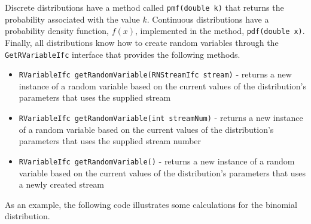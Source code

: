 \documentclass[
]{book}
\providecommand{\tightlist}{%
  \setlength{\itemsep}{0pt}\setlength{\parskip}{0pt}}
\theoremstyle{definition}
\theoremstyle{definition}
\theoremstyle{definition}
\theoremstyle{definition}
\theoremstyle{remark}
\begin{document}
Discrete distributions have a method called \texttt{pmf(double\ k)} that returns the probability associated with the value \(k\). Continuous distributions have a probability density function, \(f(x)\), implemented in the method, \texttt{pdf(double\ x)}. Finally, all distributions know how to create random variables through the \texttt{GetRVariableIfc} interface that provides the following methods.

\begin{itemize}
\tightlist
\item
  \texttt{RVariableIfc\ getRandomVariable(RNStreamIfc\ stream)} - returns a new instance of a random variable based on the current values of the distribution's parameters that uses the supplied stream
\item
  \texttt{RVariableIfc\ getRandomVariable(int\ streamNum)} - returns a new instance of a random variable based on the current values of the distribution's parameters that uses the supplied stream number
\item
  \texttt{RVariableIfc\ getRandomVariable()} - returns a new instance of a random variable based on the current values of the distribution's parameters that uses a newly created stream
\end{itemize}

As an example, the following code illustrates some calculations for the binomial distribution.
\end{document}

